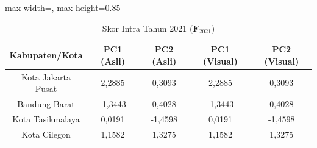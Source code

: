 \begin{table}[H]
\centering
\caption{Skor Intra Tahun 2021 ($\mathbf{F}_{2021}$)} \label{tab:sample2skor_intra_2021}
\begin{adjustbox}{max width=\textwidth, max height=0.85\textheight}
\begin{tabular}{|c|c|c|c|c|}
\hline
\textbf{Kabupaten/Kota} & \textbf{PC1 (Asli)} & \textbf{PC2 (Asli)} & \textbf{PC1 (Visual)} & \textbf{PC2 (Visual)} \\
\hline
Kota Jakarta Pusat & 2,2885 & 0,3093 & 2,2885 & 0,3093 \\
Bandung Barat & -1,3443 & 0,4028 & -1,3443 & 0,4028 \\
Kota Tasikmalaya & 0,0191 & -1,4598 & 0,0191 & -1,4598 \\
Kota Cilegon & 1,1582 & 1,3275 & 1,1582 & 1,3275 \\
\hline
\end{tabular}
\end{adjustbox}
\end{table}
